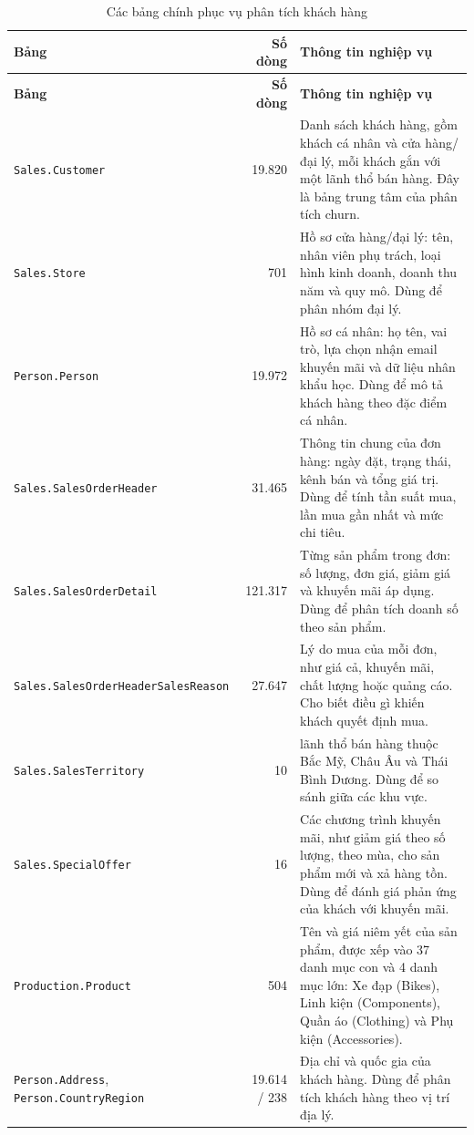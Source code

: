 \documentclass[a4paper,12pt]{article}
\numberwithin{figure}{section}
\numberwithin{table}{section}
\begin{document}
{\small
\begin{longtable}{>{\raggedright\arraybackslash}p{4.7cm} r >{\raggedright\arraybackslash}p{7.7cm}}
\caption{Các bảng chính phục vụ phân tích khách hàng}
\label{tab:c1-tables} \\
\toprule
\rowcolor{tblhead} \textbf{Bảng} & \textbf{Số dòng} & \textbf{Thông tin nghiệp vụ} \\
\midrule
\endfirsthead
\toprule
\rowcolor{tblhead} \textbf{Bảng} & \textbf{Số dòng} & \textbf{Thông tin nghiệp vụ} \\
\midrule
\endhead
\bottomrule
\endlastfoot
\texttt{Sales.Customer} & 19.820 & Danh sách khách hàng, gồm khách cá nhân và cửa hàng/đại lý, mỗi khách gắn với một lãnh thổ bán hàng. Đây là bảng trung tâm của phân tích churn. \\
\texttt{Sales.Store} & 701 & Hồ sơ cửa hàng/đại lý: tên, nhân viên phụ trách, loại hình kinh doanh, doanh thu năm và quy mô. Dùng để phân nhóm đại lý. \\
\texttt{Person.Person} & 19.972 & Hồ sơ cá nhân: họ tên, vai trò, lựa chọn nhận email khuyến mãi và dữ liệu nhân khẩu học. Dùng để mô tả khách hàng theo đặc điểm cá nhân. \\
\texttt{Sales.SalesOrderHeader} & 31.465 & Thông tin chung của đơn hàng: ngày đặt, trạng thái, kênh bán và tổng giá trị. Dùng để tính tần suất mua, lần mua gần nhất và mức chi tiêu. \\
\texttt{Sales.SalesOrderDetail} & 121.317 & Từng sản phẩm trong đơn: số lượng, đơn giá, giảm giá và khuyến mãi áp dụng. Dùng để phân tích doanh số theo sản phẩm. \\
\texttt{Sales.SalesOrderHeader\-SalesReason} & 27.647 & Lý do mua của mỗi đơn, như giá cả, khuyến mãi, chất lượng hoặc quảng cáo. Cho biết điều gì khiến khách quyết định mua. \\
\texttt{Sales.SalesTerritory} & 10 & 10 lãnh thổ bán hàng thuộc Bắc Mỹ, Châu Âu và Thái Bình Dương. Dùng để so sánh giữa các khu vực. \\
\texttt{Sales.SpecialOffer} & 16 & Các chương trình khuyến mãi, như giảm giá theo số lượng, theo mùa, cho sản phẩm mới và xả hàng tồn. Dùng để đánh giá phản ứng của khách với khuyến mãi. \\
\texttt{Production.Product} & 504 & Tên và giá niêm yết của sản phẩm, được xếp vào 37 danh mục con và 4 danh mục lớn: Xe đạp (Bikes), Linh kiện (Components), Quần áo (Clothing) và Phụ kiện (Accessories). \\
\texttt{Person.Address}, \texttt{Person.CountryRegion} & 19.614 / 238 & Địa chỉ và quốc gia của khách hàng. Dùng để phân tích khách hàng theo vị trí địa lý. \\
\end{longtable}
}
\end{document}
